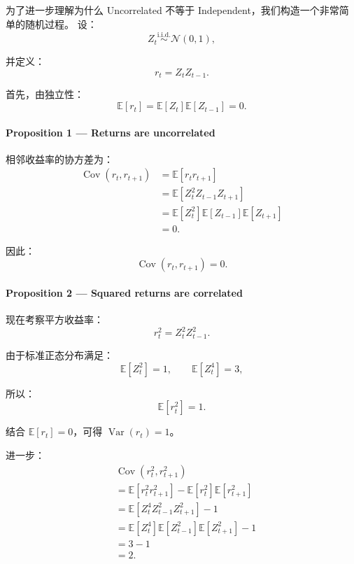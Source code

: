 为了进一步理解为什么 Uncorrelated 不等于 Independent，我们构造一个非常简单的随机过程。 设：
\[Z_t\overset{\mathrm{i.i.d.}}{\sim}\mathcal N(0,1),\]

并定义：
\[r_t=Z_tZ_{t-1}.\]

首先，由独立性：
\[\mathbb E[r_t]
=
\mathbb E[Z_t]\mathbb E[Z_{t-1}]
=0.\]

\hypertarget{part-4-58-0007-proposition-1-returns-are-uncorrelated}{%
\paragraph{Proposition 1 --- Returns are uncorrelated}\label{part-4-58-0007-proposition-1-returns-are-uncorrelated}}

相邻收益率的协方差为：
\[\begin{aligned}
\operatorname{Cov}(r_t,r_{t+1})
&=\mathbb E[r_tr_{t+1}]\\
&=\mathbb E[Z_t^2Z_{t-1}Z_{t+1}]\\
&=\mathbb E[Z_t^2]
\mathbb E[Z_{t-1}]
\mathbb E[Z_{t+1}]\\
&=0.
\end{aligned}\]

因此：
\[\boxed{
\operatorname{Cov}(r_t,r_{t+1})=0.
}\]

\hypertarget{part-4-58-0007-proposition-2-squared-returns-are-correlated}{%
\paragraph{Proposition 2 --- Squared returns are correlated}\label{part-4-58-0007-proposition-2-squared-returns-are-correlated}}

现在考察平方收益率：
\[r_t^2=Z_t^2Z_{t-1}^2.\]

由于标准正态分布满足：
\[\mathbb E[Z_t^2]=1,
\qquad
\mathbb E[Z_t^4]=3,\]

所以：
\[\mathbb E[r_t^2]=1.\]

结合 \(\mathbb E[r_t]=0\)，可得 \(\operatorname{Var}(r_t)=1\)。

进一步：
\[\begin{aligned}
&\operatorname{Cov}(r_t^2,r_{t+1}^2)\\
&=\mathbb E[r_t^2r_{t+1}^2]
-\mathbb E[r_t^2]\mathbb E[r_{t+1}^2]\\
&=\mathbb E[Z_t^4Z_{t-1}^2Z_{t+1}^2]-1\\
&=\mathbb E[Z_t^4]
\mathbb E[Z_{t-1}^2]
\mathbb E[Z_{t+1}^2]-1\\
&=3-1\\
&=2.
\end{aligned}\]

